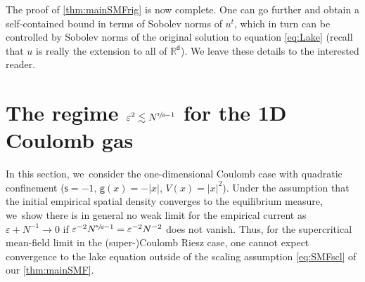 \documentclass[10pt]{amsart}
\theoremstyle{plain}
\theoremstyle{definition}
\newcommand{\R}{{\mathbb{R}}}
\let\vep\varepsilon
\renewcommand{\d}{\mathsf{d}}
\newcommand{\g}{{\mathsf{g}}}
\newcommand{\s}{\mathsf{s}}
\begin{document}
The proof of \cref{thm:mainSMFrig} is now complete. One can go further and obtain a self-contained bound in terms of Sobolev norms of $u^t$, which in turn can be controlled by Sobolev norms of the original solution to equation \eqref{eq:Lake} (recall that $u$ is really the extension to all of $\R^\d$). We leave these details to the interested reader.

\section{The regime \texorpdfstring{$\vep^2 \lesssim N^{\sfrac{\s}{\d}-1}$ for the 1D Coulomb gas}{1DCG}}\label{sec:1DCou}

In this section, we~consider the one-dimensional Coulomb case with quadratic confinement (\ie $\s=-1$, $\g(x)= - |x|$, $V(x)=|x|^2$). Under the assumption that the initial empirical spatial density converges to the equilibrium measure, we~show there is in general no weak limit for the empirical current as $\vep + N^{-1}\to 0$ if $\vep^{-2} N^{\sfrac{\s}{\d}-1} = \vep^{-2} N^{-2}$ does not vanish. Thus, for the supercritical mean-field limit in the (super-)Coulomb Riesz case, one cannot expect convergence to the lake equation outside of the scaling assumption \eqref{eq:SMFscl} of our \cref{thm:mainSMF}.
\end{document}
